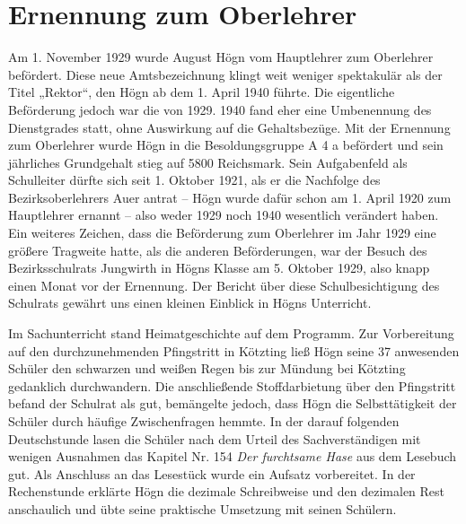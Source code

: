 \documentclass{book}
\begin{document}
\section{Ernennung zum Oberlehrer}

Am 1. November 1929 wurde August Högn vom Hauptlehrer zum Oberleh\-rer
befördert. Diese neue Amtsbezeichnung klingt weit weniger spektakulär
als der Titel „Rektor“, den Högn ab dem 1. April 1940 führte. Die
eigentliche Beförderung jedoch war die von 1929. 1940 fand eher eine
Umbenennung des Dienstgrades statt, ohne Auswirkung auf die
Gehaltsbezüge. Mit der Ernen\-nung zum Oberlehrer wurde Högn in die
Besoldungsgruppe A 4 a befördert und sein jährliches Grundgehalt stieg
auf 5800 Reichsmark. Sein Aufgaben\-feld als Schulleiter dürfte sich
seit 1. Oktober 1921, als er die Nachfolge des Bezirksoberlehrers Auer
antrat – Högn wurde dafür schon am 1. April 1920 zum Hauptlehrer
ernannt – also weder 1929 noch 1940 wesentlich verändert haben. Ein
weiteres Zeichen, dass die Beförderung zum Oberlehrer im Jahr 1929 eine
größere Tragweite hatte, als die anderen Beförderungen, war der
Be\-such des Bezirksschulrats Jungwirth in Högns Klasse am 5. Oktober
1929, also knapp einen Monat vor der Ernennung. Der Bericht über diese
Schulbe\-sichtigung des Schulrats gewährt uns einen kleinen Einblick in
Högns Unter\-richt. 

 


Im Sachunterricht stand Heimatgeschichte auf dem Programm. Zur
Vor\-bereitung auf den durchzunehmenden Pfingstritt in Kötzting ließ
Högn seine 37 anwesenden Schüler den schwarzen und weißen Regen bis zur
Mündung bei Kötzting gedanklich durchwandern. Die anschließende
Stoffdarbietung über den Pfingstritt befand der Schulrat als gut,
bemängelte jedoch, dass Högn die Selbsttätigkeit der Schüler durch
häufige Zwischenfragen hemmte. In der darauf folgenden Deutschstunde
lasen die Schüler nach dem Urteil des Sachverständigen mit wenigen
Ausnahmen das Kapitel Nr. 154 \textit{Der furchtsame Hase} aus dem
Lesebuch gut. Als Anschluss an das Lesestück wurde ein Aufsatz
vorbereitet. In der Rechenstunde erklärte Högn die dezimale
Schreibweise und den dezimalen Rest anschaulich und übte seine
praktische Umsetzung mit seinen Schülern.
\end{document}
